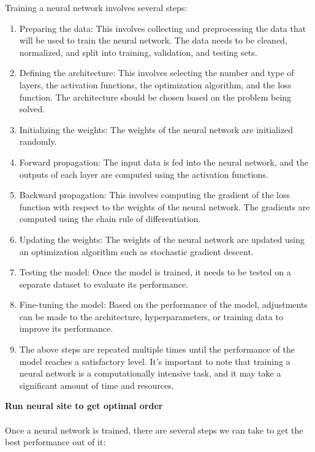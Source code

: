        Training a neural network involves several steps:
        \begin{enumerate}
            \item Preparing the data: This involves collecting and preprocessing the data that will be used to train
            the neural network. The data needs to be cleaned, normalized, and split into training, validation, and
            testing sets.
            \item Defining the architecture: This involves selecting the number and type of layers, the activation
            functions, the optimization algorithm, and the loss function. The architecture should be chosen
            based on the problem being solved.
            \item Initializing the weights: The weights of the neural network are initialized randomly.
            \item Forward propagation: The input data is fed into the neural network, and the outputs of each layer are
            computed using the activation functions.
            \item Backward propagation: This involves computing the gradient of the loss function with respect to the 
            weights of the neural network. The gradients are computed using the chain rule of differentiation.
            \item Updating the weights: The weights of the neural network are updated using an optimization algorithm
            such as stochastic gradient descent.
            \item Testing the model: Once the model is trained, it needs to be tested on a separate dataset to
            evaluate its performance.
            \item Fine-tuning the model: Based on the performance of the model, adjustments can be made to the
            architecture, hyperparameters, or training data to improve its performance.
            \item The above steps are repeated multiple times until the performance of the model
            reaches a satisfactory level. It's important to note that training a neural network is a computationally
            intensive task, and it may take a significant amount of time and resources.
        \end{enumerate}
        \textbf{Run neural site to get optimal order}\\
        \\
        Once a neural network is trained, there are several steps we can take to get the best performance out of it:
